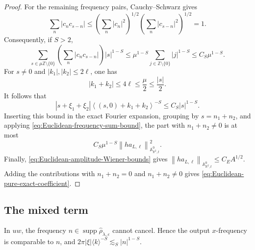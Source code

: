 \documentclass[12pt,reqno,letterpaper]{amsart}
\numberwithin{equation}{section}
\theoremstyle{definition}
\newcommand{\R}{\mathbb R}
\newcommand{\Z}{\mathbb Z}
\newcommand{\A}{\mathbb A}
\newcommand{\eps}{\varepsilon}
\newcommand{\la}{\lambda}
\newcommand{\supp}{\operatorname{supp}}
\newcommand{\norm}[1]{\left\lVert #1\right\rVert}
\newcommand{\abs}[1]{\left\lvert #1\right\rvert}
\begin{document}
\begin{proof}
For the remaining frequency pairs, Cauchy--Schwarz gives
\[
 \sum_n\abs{c_nc_{s-n}}
 \leq\left(\sum_n\abs{c_n}^2\right)^{1/2}
      \left(\sum_n\abs{c_{s-n}}^2\right)^{1/2}=1.
\]
Consequently, if $S>2$,
\begin{equation}\label{eq:Euclidean-frequency-sum-bound}
   \sum_{s\in\mu\Z\setminus\{0\}}
      \left(\sum_n\abs{c_nc_{s-n}}\right)\abs{s}^{1-S}
   \leq\mu^{1-S}\sum_{j\in\Z\setminus\{0\}}\abs j^{1-S}
   \leq C_S\mu^{1-S}.
\end{equation}
For $s\neq0$ and $\abs{k_1},\abs{k_2}\leq2\ell$, one has
\[
   \abs{k_1+k_2}\leq4\ell\leq\frac\mu2\leq\frac{\abs s}{2}.
\]
It follows that
\[
 \abs{s+\xi_1+\xi_2}
 \left\langle(s,0)+k_1+k_2\right\rangle^{-S}
 \leq C_S\abs{s}^{1-S}.
\]
Inserting this bound in the exact Fourier expansion, grouping by
$s=n_1+n_2$, and applying \eqref{eq:Euclidean-frequency-sum-bound}, the
part with $n_1+n_2\neq0$ is at most
\[
 C_S\mu^{1-S}
    \norm{h a_{L,\ell}}_{\A^0_{\R^2,t}}^2.
\]
Finally, \eqref{eq:Euclidean-amplitude-Wiener-bounds} gives
$\norm{h a_{L,\ell}}_{\A^0_{\R^2,t}}\leq C_EA^{1/2}$.
Adding the contributions with $n_1+n_2=0$ and $n_1+n_2\neq0$ gives
\eqref{eq:Euclidean-pure-exact-coefficient}.
\end{proof}

\subsection{The mixed term}

In $uw$, the frequency $n\in\supp\widehat\rho_{\la,\eps}$ cannot cancel.
Hence the output $x$-frequency is comparable to $n$, and
$2\pi\abs\xi\langle k\rangle^{-S}\lesssim_S\abs n^{1-S}$.
\end{document}
